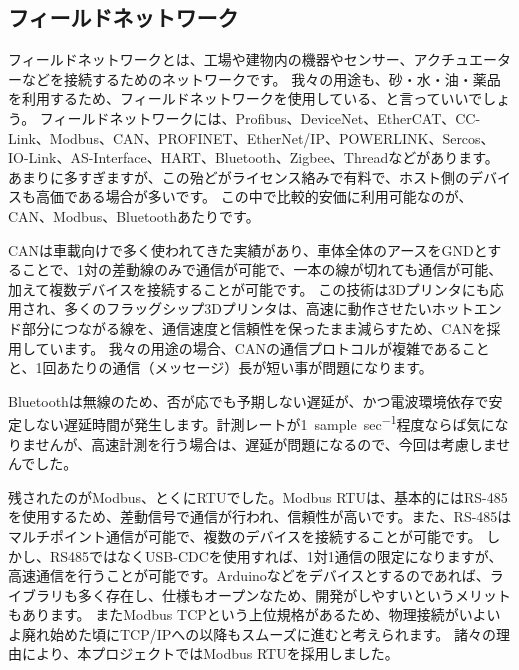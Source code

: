 \subsection{フィールドネットワーク}
フィールドネットワークとは、工場や建物内の機器やセンサー、アクチュエーターなどを接続するためのネットワークです。
我々の用途も、砂・水・油・薬品を利用するため、フィールドネットワークを使用している、と言っていいでしょう。
フィールドネットワークには、Profibus、DeviceNet、EtherCAT、CC-Link、Modbus、CAN、PROFINET、EtherNet/IP、POWERLINK、Sercos、IO-Link、AS-Interface、HART、Bluetooth、Zigbee、Threadなどがあります。
あまりに多すぎますが、この殆どがライセンス絡みで有料で、ホスト側のデバイスも高価である場合が多いです。
この中で比較的安価に利用可能なのが、CAN、Modbus、Bluetoothあたりです。

CANは車載向けで多く使われてきた実績があり、車体全体のアースをGNDとすることで、1対の差動線のみで通信が可能で、一本の線が切れても通信が可能、加えて複数デバイスを接続することが可能です。
この技術は3Dプリンタにも応用され、多くのフラッグシップ3Dプリンタは、高速に動作させたいホットエンド部分につながる線を、通信速度と信頼性を保ったまま減らすため、CANを採用しています。
我々の用途の場合、CANの通信プロトコルが複雑であることと、1回あたりの通信（メッセージ）長が短い事が問題になります。

Bluetoothは無線のため、否が応でも予期しない遅延が、かつ電波環境依存で安定しない遅延時間が発生します。計測レートが\qty{1}{sample\per sec}程度ならば気になりませんが、高速計測を行う場合は、遅延が問題になるので、今回は考慮しませんでした。

残されたのがModbus、とくにRTUでした。Modbus RTUは、基本的にはRS-485を使用するため、差動信号で通信が行われ、信頼性が高いです。また、RS-485はマルチポイント通信が可能で、複数のデバイスを接続することが可能です。
しかし、RS485ではなくUSB-CDCを使用すれば、1対1通信の限定になりますが、高速通信を行うことが可能です。Arduinoなどをデバイスとするのであれば、ライブラリも多く存在し、仕様もオープンなため、開発がしやすいというメリットもあります。
またModbus TCPという上位規格があるため、物理接続がいよいよ廃れ始めた頃にTCP/IPへの以降もスムーズに進むと考えられます。
諸々の理由により、本プロジェクトではModbus RTUを採用しました。

